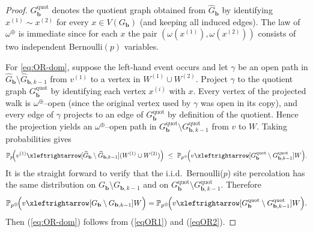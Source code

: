\documentclass[11pt]{amsart}
\theoremstyle{plain}
\numberwithin{equation}{section}
\numberwithin{figure}{section}
\newcommand\PP{{\mathbb P}}
\begin{document}
\begin{proof}
$G_{\mathbf b}^{\mathrm{quot}}$ denotes the quotient graph obtained from
$\widehat G_{\mathbf b}$ by identifying $x^{(1)}\sim x^{(2)}$ for every $x\in V(G_{\mathbf b})$
(and keeping all induced edges).
The law of $\omega^\oplus$ is immediate since for each $x$ the pair
$(\omega(x^{(1)}),\omega(x^{(2)}))$ consists of two independent Bernoulli$(p)$ variables.

For \eqref{eq:OR-dom}, suppose the left-hand event occurs and let $\gamma$ be an open path in
$\widehat G_{\mathbf b}\setminus \widehat G_{\mathbf b,k-1}$ from $v^{(1)}$ to a vertex in $W^{(1)}\cup W^{(2)}$.
Project $\gamma$ to the quotient graph $G_{\mathbf b}^{\mathrm{quot}}$ by identifying each vertex
$x^{(i)}$ with $x$. Every vertex of the projected walk is $\omega^\oplus$--open (since the original
vertex used by $\gamma$ was open in its copy), and every edge of $\gamma$ projects to an edge of
$G_{\mathbf b}^{\mathrm{quot}}$ by definition of the quotient.
Hence the projection yields an $\omega^\oplus$--open path in
$G_{\mathbf b}^{\mathrm{quot}}\setminus G_{\mathbf b,k-1}^{\mathrm{quot}}$ from $v$ to $W$.
Taking probabilities gives \begin{equation}\label{eqOR1}
\PP_{p}\!\Bigl(
v^{(1)} \xleftrightarrow[\widehat G_{\mathbf b}\setminus \widehat G_{\mathbf b,k-1}]{} (W^{(1)}\cup W^{(2)})
\Bigr)
\ \le\
\PP_{p^\oplus}\!\Bigl(
v \xleftrightarrow[G_{\mathbf b}^{\mathrm{quot}}\setminus G_{\mathbf b,k-1}^{\mathrm{quot}}]{} W
\Bigr).
\end{equation}
It is the straight forward to verify that the i.i.d.~Bernoulli($p$) site percolation has the same distribution on $G_{\mathbf b}\setminus G_{\mathbf b,k-1}$ and on $G_{\mathbf b}^{\mathrm{quot}}\setminus G_{\mathbf b,k-1}^{\mathrm{quot}}$.
Therefore 
\begin{align}
\PP_{p^\oplus}\!\Bigl(
v \xleftrightarrow[G_{\mathbf b}\setminus G_{\mathbf b,k-1}]{} W\Bigr)=\PP_{p^\oplus}\!\Bigl(
v \xleftrightarrow[G_{\mathbf b}^{\mathrm{quot}}\setminus G_{\mathbf b,k-1}^{\mathrm{quot}}]{} W \Bigr)\label{eqOR2}.
\end{align}
Then (\ref{eq:OR-dom}) follows from (\ref{eqOR1}) and (\ref{eqOR2}).
\end{proof}
\end{document}
